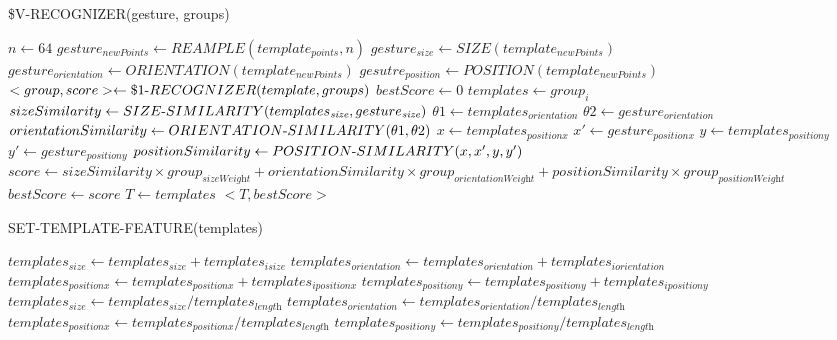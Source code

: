 \begin{algorithm}
  \caption*{\$V-RECOGNIZER(gesture, groups)}
  \begin{algorithmic}[1]
  \State $n\gets 64$
  \State $gesture_\textit{newPoints} \gets REAMPLE(template_\textit{points}, n)$ 
  \State $gesture_\textit{size}\gets SIZE(template_\textit{newPoints})$
  \State $gesture_\textit{orientation}\gets ORIENTATION(template_\textit{newPoints})$
  \State $gesutre_\textit{position}\gets POSITION(template_\textit{newPoints})$
  \State $<group, score>\gets \$1\mathchar`-RECOGNIZER(template, groups)$
  \State $bestScore\gets 0$
    	\State $templates\gets group_\textit{i}$
	\State $sizeSimilarity\gets SIZE\mathchar`-SIMILARITY(templates_\textit{size}, gesture_\textit{size})$
	\State $\theta 1\gets templates_\textit{orientation}$
	\State $\theta 2\gets gesture_\textit{orientation}$
	\State $orientationSimilarity\gets ORIENTATION\mathchar`-SIMILARITY(\theta 1, \theta 2)$
	\State $x\gets templates_\textit{positionx}$
	\State $x'\gets gesture_\textit{positionx}$
	\State $y\gets templates_\textit{positiony}$
	\State $y'\gets gesture_\textit{positiony}$
	\State $positionSimilarity\gets POSITION\mathchar`-SIMILARITY(x, x', y, y')$
	\State $score\gets sizeSimilarity\times group_\textit{sizeWeight} + orientationSimilarity\times group_\textit{orientationWeight} + positionSimilarity\times group_\textit{positionWeight}$
		\State $bestScore\gets score$
		\State $T\gets templates$
	\EndIf
  \EndFor
  \Return $<T, bestScore>$
\end{algorithmic}
\end{algorithm}


\begin{algorithm}
  \caption*{SET-TEMPLATE-FEATURE(templates)}
  \begin{algorithmic}[1]
  \State $templates_\textit{size}\gets templates_\textit{size} + templates_\textit{isize}$
  \State $templates_\textit{orientation}\gets templates_\textit{orientation} + templates_\textit{iorientation}$
  \State $templates_\textit{positionx}\gets templates_\textit{positionx} + templates_\textit{ipositionx}$
  \State $templates_\textit{positiony}\gets templates_\textit{positiony} + templates_\textit{ipositiony}$
  \EndFor
  \State $templates_\textit{size}\gets templates_\textit{size} / templates_\textit{length}$
  \State $templates_\textit{orientation}\gets templates_\textit{orientation} / templates_\textit{length}$
  \State $templates_\textit{positionx}\gets templates_\textit{positionx} / templates_\textit{length}$
  \State $templates_\textit{positiony}\gets templates_\textit{positiony} / templates_\textit{length}$
\end{algorithmic}
\end{algorithm}


